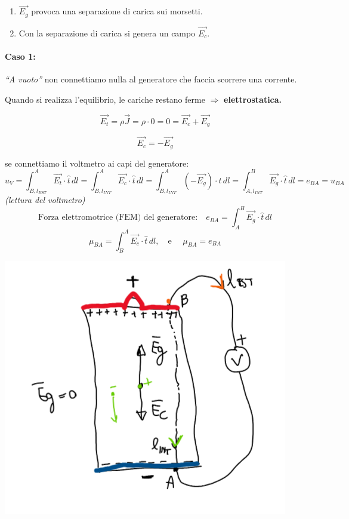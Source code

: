 \begin{enumerate}
  \item $\vec{E_g}$ provoca una separazione di carica sui morsetti.
  \item Con la separazione di carica si genera un campo $\vec{E_c}$.
\end{enumerate}

\paragraph{Caso 1:} 
\textit{“A vuoto”} non connettiamo nulla al generatore che faccia scorrere una corrente.

\medskip
Quando si realizza l’equilibrio, le cariche restano ferme $\Rightarrow$ \textbf{elettrostatica.}

\[
\vec{E_t} = \rho \vec{J} = \rho \cdot 0 = 0 = \vec{E_c} + \vec{E_g}
\]

\[
\boxed{\vec{E_c} = -\vec{E_g}}
\]

se connettiamo il voltmetro ai capi del generatore:
\[
u_V = \int_{B,l_{EST}}^A \vec{E_t} \cdot \hat{t}\, dl 
    = \int_{B,l_{INT}}^A \vec{E_c} \cdot \hat{t}\, dl
    = \int_{B,l_{INT}}^A (-\vec{E_g}) \cdot \hat{t}\, dl 
    = \int_{A,l_{INT}}^B \vec{E_g} \cdot \hat{t}\, dl = e_{BA} = u_{BA}
\]
\noindent
\textit{(lettura del voltmetro)}  
\[
\text{Forza elettromotrice (FEM) del generatore:} \quad
e_{BA} = \int_A^B \vec{E_g} \cdot \hat{t}\, dl
\]
\[
\mu_{BA} = \int_B^A \vec{E_c} \cdot \hat{t}\, dl, 
\quad \text{e } \quad \mu_{BA} = e_{BA}
\]
\begin{center}
    \includegraphics[scale = 0.7]{immagini/image18.png}
\end{center}

